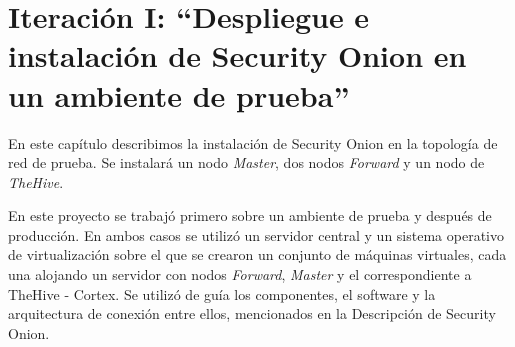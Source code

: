 \chapter{\Large Iteración I: “Despliegue e instalación de Security Onion en un ambiente de prueba”}
    En este capítulo describimos la instalación de Security Onion en la topología de red de prueba. Se instalará un nodo \textit{Master}, dos nodos \textit{Forward} y un nodo de \textit{TheHive}. \par
    En este proyecto se trabajó primero sobre un ambiente de prueba y después de producción. En ambos casos se utilizó un servidor central y un sistema operativo de virtualización sobre el que se crearon un conjunto de máquinas virtuales, cada una alojando un servidor con nodos \textit{Forward}, \textit{Master} y el correspondiente a TheHive - Cortex. Se utilizó de guía los componentes, el software y la arquitectura de conexión entre ellos, mencionados en la Descripción de Security Onion. \par

